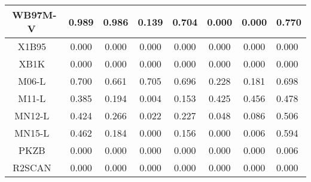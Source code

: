\begin{tabular}{|c|c|c|c|c|c|c|l|}
                           WB97M-V~\cite{Mardirossian2016_214110} &                0.989 &                          0.986 &             0.139 &                        0.704 &                0.000 &                0.000 &                       0.770 \\ \hline
                                       X1B95~\cite{Zhao2004_6908} &                0.000 &                          0.000 &             0.000 &                        0.000 &                0.000 &                0.000 &                       0.000 \\ \hline
                                        XB1K~\cite{Zhao2004_6908} &                0.000 &                          0.000 &             0.000 &                        0.000 &                0.000 &                0.000 &                       0.000 \\ \hline
                        M06-L~\cite{Zhao2006_194101,Zhao2008_215} &                0.700 &                          0.661 &             0.705 &                        0.696 &                0.228 &                0.181 &                       0.698 \\ \hline
                                    M11-L~\cite{Peverati2012_117} &                0.385 &                          0.194 &             0.004 &                        0.153 &                0.425 &                0.456 &                       0.478 \\ \hline
                                 MN12-L~\cite{Peverati2012_13171} &                0.424 &                          0.266 &             0.022 &                        0.227 &                0.048 &                0.086 &                       0.506 \\ \hline
                                        MN15-L~\cite{Yu2016_1280} &                0.462 &                          0.184 &             0.000 &                        0.156 &                0.000 &                0.006 &                       0.594 \\ \hline
                                      PKZB~\cite{Perdew1999_2544} &                0.000 &                          0.000 &             0.000 &                        0.000 &                0.000 &                0.000 &                       0.006 \\ \hline
                  R2SCAN~\cite{Furness2020_8208,Furness2020_9248} &                0.000 &                          0.000 &             0.000 &                        0.000 &                0.000 &                0.000 &                       0.000 \\ \hline

\end{tabular}
